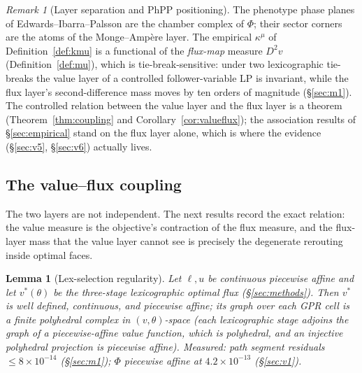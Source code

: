 \documentclass[11pt,a4paper]{article}
\theoremstyle{plain}
\newtheorem{lemma}[theorem]{Lemma}
\theoremstyle{definition}
\theoremstyle{remark}
\newtheorem{remark}[theorem]{Remark}
\newcommand{\kmu}{\kappa^{\mu}}
\begin{document}
\begin{remark}[Layer separation and PhPP positioning]\label{rem:layersep}
The phenotype phase planes of Edwards--Ibarra--Palsson
\citep{edwards2001, ibarra2002} are the chamber
complex of $\Phi$; their sector corners are the atoms of the
Monge--Amp\`ere layer. The empirical $\kmu$ of
Definition~\ref{def:kmu} is a functional of the \emph{flux-map} measure
$D^2 v$ (Definition~\ref{def:mu}), which is tie-break-sensitive: under
two lexicographic tie-breaks the value layer of a controlled
follower-variable LP is invariant, while the flux layer's
second-difference mass moves by ten orders of magnitude (\S\ref{sec:m1}). The
controlled relation between the value layer and the flux layer is
a theorem (Theorem~\ref{thm:coupling} and
Corollary~\ref{cor:valueflux}); the association results of
\S\ref{sec:empirical} stand on the flux layer alone, which is where
the evidence (\S\ref{sec:v5}, \S\ref{sec:v6}) actually lives.
\end{remark}

\subsection{The value--flux coupling}

The two layers are not independent. The next results record the exact
relation: the value measure is the objective's contraction of the
flux measure, and the flux-layer mass that the value layer cannot see
is precisely the degenerate rerouting inside optimal faces.

\begin{lemma}[Lex-selection regularity]\label{lem:lex}
Let $\ell, u$ be continuous piecewise affine and let $v^*(\theta)$ be
the three-stage lexicographic optimal flux (\S\ref{sec:methods}).
Then $v^*$ is well defined, continuous, and piecewise affine; its
graph over each GPR cell is a finite polyhedral complex in
$(v,\theta)$-space (each
lexicographic stage adjoins the graph of a piecewise-affine value
function, which is polyhedral, and an injective polyhedral projection
is piecewise affine). Measured: path segment residuals $\le 8 \times 10^{-14}$ (\S\ref{sec:m1}); $\Phi$ piecewise affine at $4.2 \times 10^{-13}$ (\S\ref{sec:v1}).
\end{lemma}
\end{document}
